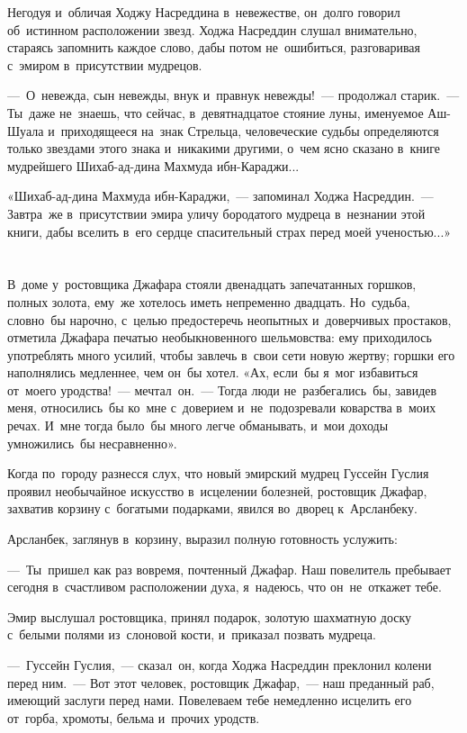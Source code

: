 \documentclass[12pt,a4paper]{book}
\begin{document}
Негодуя и~обличая Ходжу Насреддина в~невежестве, он~долго говорил об~истинном расположении звезд. Ходжа Насреддин слушал внимательно, стараясь запомнить каждое слово, дабы потом не~ошибиться, разговаривая с~эмиром в~присутствии мудрецов.

—~О~невежда, сын невежды, внук и~правнук невежды!~— продолжал старик.~— Ты~даже не~знаешь, что сейчас, в~девятнадцатое стояние луны, именуемое Аш-Шуала и~приходящееся на~знак Стрельца, человеческие судьбы определяются только звездами этого знака и~никакими другими, о~чем ясно сказано в~книге мудрейшего Шихаб-ад-дина Махмуда ибн-Караджи...

«Шихаб-ад-дина Махмуда ибн-Караджи,~— запоминал Ходжа Насреддин.~— Завтра~же в~присутствии эмира уличу бородатого мудреца в~незнании этой книги, дабы вселить в~его сердце спасительный страх перед моей ученостью...»


\chapter{}

В~доме у~ростовщика Джафара стояли двенадцать запечатанных горшков, полных золота, ему~же хотелось иметь непременно двадцать. Но~судьба, словно~бы нарочно, с~целью предостеречь неопытных и~доверчивых простаков, отметила Джафара печатью необыкновенного шельмовства: ему приходилось употреблять много усилий, чтобы завлечь в~свои сети новую жертву; горшки его наполнялись медленнее, чем он~бы хотел. «Ах, если~бы я~мог избавиться от~моего уродства!~— мечтал~он.~— Тогда люди не~разбегались~бы, завидев меня, относились~бы ко~мне с~доверием и~не~подозревали коварства в~моих речах. И~мне тогда было~бы много легче обманывать, и~мои доходы умножились~бы несравненно».

Когда по~городу разнесся слух, что новый эмирский мудрец Гуссейн Гуслия проявил необычайное искусство в~исцелении болезней, ростовщик Джафар, захватив корзину с~богатыми подарками, явился во~дворец к~Арсланбеку.

Арсланбек, заглянув в~корзину, выразил полную готовность услужить:

—~Ты~пришел как раз вовремя, почтенный Джафар. Наш повелитель пребывает сегодня в~счастливом расположении духа, я~надеюсь, что он~не~откажет тебе.

Эмир выслушал ростовщика, принял подарок, золотую шахматную доску с~белыми полями из~слоновой кости, и~приказал позвать мудреца.

—~Гуссейн Гуслия,~— сказал~он, когда Ходжа Насреддин преклонил колени перед ним.~— Вот этот человек, ростовщик Джафар,~— наш преданный раб, имеющий заслуги перед нами. Повелеваем тебе немедленно исцелить его от~горба, хромоты, бельма и~прочих уродств.
\end{document}
